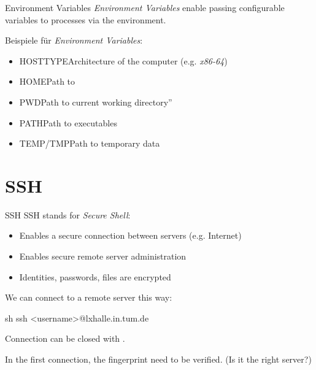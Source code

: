 \documentclass{setbeamer}
\begin{document}
\begin{frame}{Environment Variables}
    \emph{Environment Variables} enable passing configurable variables to processes via the environment.

    \vspace{0.3cm}

    Beispiele für \emph{Environment Variables}:
    \begin{itemize}
        \item HOSTTYPE\textemdash Architecture of the computer (e.g. \emph{x86-64})
        \item HOME\textemdash Path to 
        \item PWD\textemdash Path to current working directory''
        \item PATH\textemdash Path to executables
        \item TEMP/TMP\textemdash Path to temporary data
    \end{itemize}

\end{frame}

\section{SSH}

\begin{frame}[fragile]{SSH}
    SSH stands for \emph{Secure Shell}:
    \begin{itemize}
        \item Enables a secure connection between servers (e.g. Internet)
        \item Enables secure remote server administration
        \item Identities, passwords, files are encrypted
    \end{itemize}

    \pause
    \vspace{0.3cm}

    We can connect to a remote server this way:

    \vspace{0.3cm}

    \begin{TUMCodeBlock}{}{sh}
        ssh <username>@lxhalle.in.tum.de
    \end{TUMCodeBlock}
    {\Large \MVRightarrow} Connection can be closed with .

    \vspace{0.3cm}

    In the first connection, the fingerprint  need to be verified. (Is it the right server?)
\end{frame}
\end{document}
